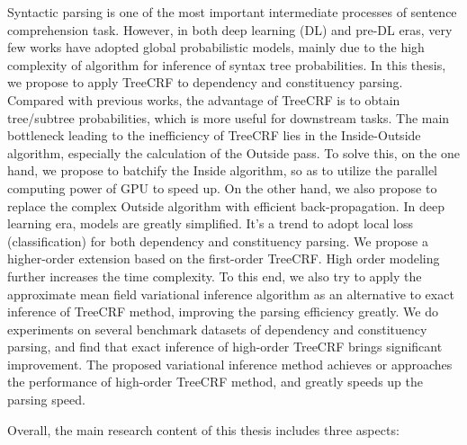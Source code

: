 
\begin{eabstract}
  Syntactic parsing is one of the most important intermediate processes of sentence comprehension task.
  However, in both deep learning (DL) and pre-DL eras, very few works have adopted global probabilistic models, mainly due to the high complexity of algorithm for inference of syntax tree probabilities.
  In this thesis, we propose to apply TreeCRF to dependency and constituency parsing.
  Compared with previous works, the advantage of TreeCRF is to obtain tree/subtree probabilities, which is more useful for downstream tasks.
  The main bottleneck leading to the inefficiency of TreeCRF lies in the Inside-Outside algorithm, especially the calculation of the Outside pass.
  To solve this, on the one hand, we propose to batchify the Inside algorithm, so as to utilize the parallel computing power of GPU to speed up.
  On the other hand, we also propose to replace the complex Outside algorithm with efficient back-propagation.
  In deep learning era, models are greatly simplified.
  It's a trend to adopt local loss (classification) for both dependency and constituency parsing.
  We propose a higher-order extension based on the first-order TreeCRF.
  High order modeling further increases the time complexity.
  To this end, we also try to apply the approximate mean field variational inference algorithm as an alternative to exact inference of TreeCRF method, improving the parsing efficiency greatly.
  We do experiments on several benchmark datasets of dependency and constituency parsing, and find that exact inference of high-order TreeCRF brings significant improvement.
  The proposed variational inference method achieves or approaches the performance of high-order TreeCRF method, and greatly speeds up the parsing speed.

  Overall, the main research content of this thesis includes three aspects:


\end{eabstract}
